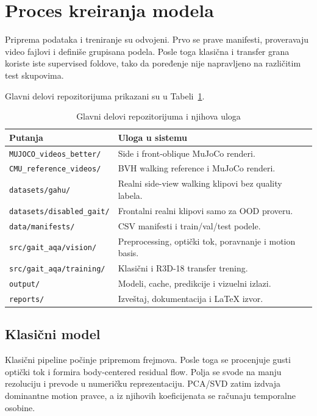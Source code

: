 ﻿\documentclass[12pt,a4paper]{report}
\begin{document}
\section{Proces kreiranja modela}

Priprema podataka i treniranje su odvojeni. Prvo se prave manifesti, proveravaju
video fajlovi i definiše grupisana podela. Posle toga klasična i transfer grana
koriste iste supervised foldove, tako da poređenje nije napravljeno na
različitim test skupovima.

Glavni delovi repozitorijuma prikazani su u Tabeli~\ref{tab:repo-parts}.

\begin{table}[H]
  \centering
  \caption{Glavni delovi repozitorijuma i njihova uloga}
  \label{tab:repo-parts}
  \footnotesize
  \begin{tabular}{p{5.3cm}p{7.6cm}}
    \toprule
    Putanja & Uloga u sistemu \\
    \midrule
    \texttt{MUJOCO\_videos\_better/} & Side i front-oblique MuJoCo renderi. \\
    \texttt{CMU\_reference\_videos/} & BVH walking reference i MuJoCo renderi. \\
    \texttt{datasets/gahu/} & Realni side-view walking klipovi bez quality labela. \\
    \texttt{datasets/disabled\_gait/} & Frontalni realni klipovi samo za OOD proveru. \\
    \texttt{data/manifests/} & CSV manifesti i train/val/test podele. \\
    \texttt{src/gait\_aqa/vision/} & Preprocessing, optički tok, poravnanje i motion basis. \\
    \texttt{src/gait\_aqa/training/} & Klasični i R3D-18 transfer trening. \\
    \texttt{output/} & Modeli, cache, predikcije i vizuelni izlazi. \\
    \texttt{reports/} & Izveštaj, dokumentacija i LaTeX izvor. \\
    \bottomrule
  \end{tabular}
\end{table}

\subsection{Klasični model}

Klasični pipeline počinje pripremom frejmova. Posle toga se procenjuje gusti
optički tok i formira body-centered residual flow. Polja se svode na manju
rezoluciju i prevode u numeričku reprezentaciju. PCA/SVD zatim izdvaja
dominantne motion pravce, a iz njihovih koeficijenata se računaju temporalne
osobine.
\end{document}
